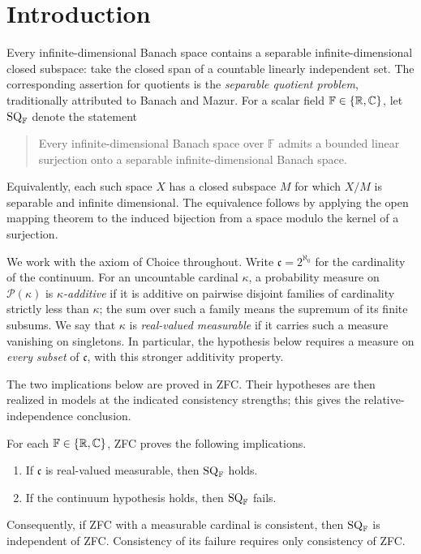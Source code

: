 \section{Introduction}\label{sec:introduction}

Every infinite-dimensional Banach space contains a separable
infinite-dimensional closed subspace: take the closed span of a countable
linearly independent set. The corresponding assertion for quotients is the
\emph{separable quotient problem}, traditionally attributed to Banach and
Mazur. For a scalar field $\mathbb F\in\{\mathbb R,\mathbb C\}$, let $\mathrm{SQ}_{\mathbb F}$
denote the statement
\begin{quote}
Every infinite-dimensional Banach space over $\mathbb F$ admits a
bounded linear surjection onto a separable infinite-dimensional
Banach space.
\end{quote}
Equivalently, each such space $X$ has a closed subspace $M$ for which
$X/M$ is separable and infinite dimensional. The equivalence follows by
applying the open mapping theorem to the induced bijection from a space
modulo the kernel of a surjection.

We work with the axiom of Choice throughout. Write
$\mathfrak c=2^{\aleph_0}$ for the cardinality of the continuum.
For an uncountable cardinal $\kappa$, a probability measure on
$\mathcal P(\kappa)$ is \emph{$\kappa$-additive} if it is additive on
pairwise disjoint families of cardinality strictly less than $\kappa$;
the sum over such a family means the supremum of its finite subsums.
We say that $\kappa$ is \emph{real-valued measurable} if it carries such
a measure vanishing on singletons. In particular, the hypothesis below
requires a measure on \emph{every subset} of $\mathfrak c$, with this
stronger additivity property.

The two implications below are proved in ZFC. Their hypotheses are then
realized in models at the indicated consistency strengths; this gives
the relative-independence conclusion.

\begin{theorem}\label{intro:main}
For each $\mathbb F\in\{\mathbb R,\mathbb C\}$, ZFC proves the following implications.
\begin{enumerate}[label=\textup{(\roman*)}]
 \item If $\mathfrak c$ is real-valued measurable, then $\mathrm{SQ}_{\mathbb F}$
 holds.
 \item If the continuum hypothesis holds, then $\mathrm{SQ}_{\mathbb F}$ fails.
\end{enumerate}
Consequently, if ZFC with a measurable cardinal is consistent, then
$\mathrm{SQ}_{\mathbb F}$ is independent of ZFC. Consistency of its failure
requires only consistency of ZFC.
\end{theorem}

